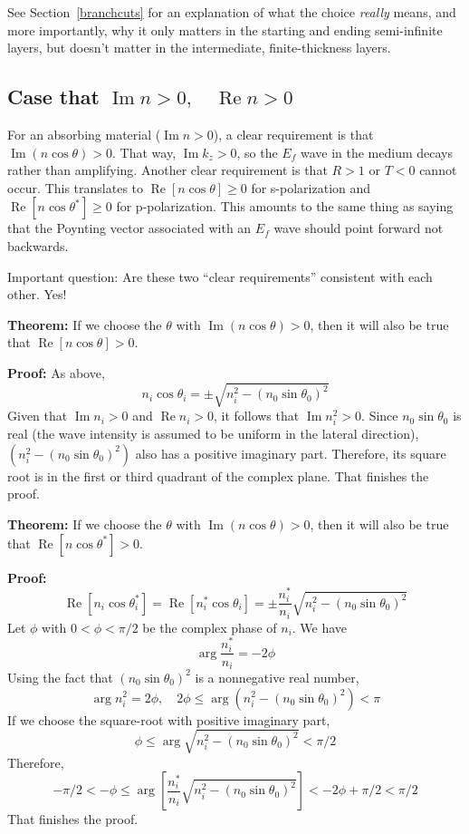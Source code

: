 \documentclass[12pt]{article}
\renewcommand{\(}{\left(}
\renewcommand{\)}{\right)}
\renewcommand{\Im}{\operatorname{Im}}
\renewcommand{\Re}{\operatorname{Re}}
\begin{document}
See Section~\ref{branchcuts} for an explanation of what the choice \emph{really} means, and more importantly, why it only matters in the starting and ending semi-infinite layers, but doesn't matter in the intermediate, finite-thickness layers.

\subsection{Case that $\Im n>0, \quad \Re n > 0$}

For an absorbing material ($\Im n > 0$), a clear requirement is that $\Im(n \cos \theta)>0$. That way, $ \Im k_z > 0$, so the $E_f$ wave in the medium decays rather than amplifying. Another clear requirement is that $R>1$ or $T<0$ cannot occur. This translates to $\Re[n \cos\theta]\geq 0$ for s-polarization and $\Re[n \cos \theta^*]\geq 0$ for p-polarization. This amounts to the same thing as saying that the Poynting vector associated with an $E_f$ wave should point forward not backwards.

Important question: Are these two ``clear requirements'' consistent with each other. Yes!

{\bf Theorem:} If we choose the $\theta$ with $\Im(n \cos \theta)>0$, then it will also be true that $\Re[n \cos\theta] > 0$.

{\bf Proof:} As above,
$$n_i \cos \theta_i = \pm \sqrt{n_i^2 - (n_0 \sin \theta_0)^2}$$
Given that $\Im n_i>0$ and $\Re n_i > 0$, it follows that $\Im n_i^2 >0$. Since $n_0 \sin \theta_0$ is real (the wave intensity is assumed to be uniform in the lateral direction), $(n_i^2 - (n_0 \sin \theta_0)^2)$ also has a positive imaginary part. Therefore, its square root is in the first or third quadrant of the complex plane. That finishes the proof.

{\bf Theorem:} If we choose the $\theta$ with $\Im(n \cos \theta)>0$, then it will also be true that $\Re[n \cos\theta^*] > 0$.

{\bf Proof:}
$$\Re[n_i \cos \theta_i^*] = \Re[n_i^* \cos \theta_i ] = \pm \frac{n_i^*}{n_i}\sqrt{n_i^2 - (n_0 \sin \theta_0)^2}$$
Let $\phi$ with $0<\phi<\pi/2$ be the complex phase of $n_i$. We have
$$\arg \frac{n_i^*}{n_i} = -2\phi$$
Using the fact that $(n_0 \sin \theta_0)^2$ is a nonnegative real number,
$$\arg n_i^2 = 2\phi, \quad 2\phi \leq \arg (n_i^2 - (n_0 \sin \theta_0)^2) < \pi$$
If we choose the square-root with positive imaginary part,
$$\phi \leq \arg \sqrt{n_i^2 - (n_0 \sin \theta_0)^2} < \pi/2$$
Therefore,
$$-\pi/2 < -\phi \leq \arg \left[ \frac{n_i^*}{n_i} \sqrt{n_i^2 - (n_0 \sin \theta_0)^2}\right] < -2\phi+\pi/2 < \pi/2$$
That finishes the proof.
\end{document}
